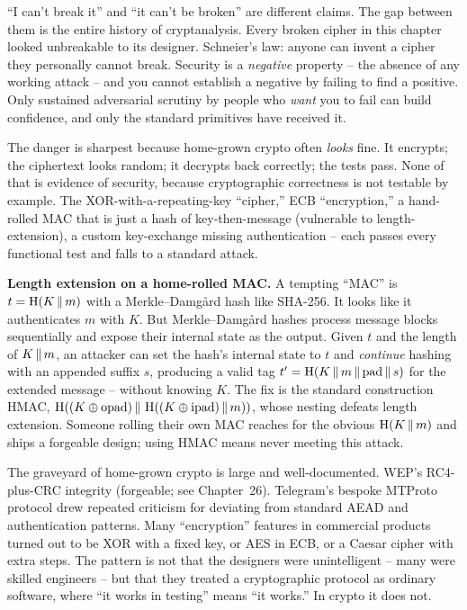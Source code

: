 \begin{intuitionbox}
``I can't break it'' and ``it can't be broken'' are different claims. The gap between them is the entire history of cryptanalysis. Every broken cipher in this chapter looked unbreakable to its designer. Schneier's law: anyone can invent a cipher they personally cannot break. Security is a \emph{negative} property -- the absence of any working attack -- and you cannot establish a negative by failing to find a positive. Only sustained adversarial scrutiny by people who \emph{want} you to fail can build confidence, and only the standard primitives have received it.
\end{intuitionbox}

The danger is sharpest because home-grown crypto often \emph{looks} fine. It encrypts; the ciphertext looks random; it decrypts back correctly; the tests pass. None of that is evidence of security, because cryptographic correctness is not testable by example. The XOR-with-a-repeating-key ``cipher,'' ECB ``encryption,'' a hand-rolled MAC that is just a hash of key-then-message (vulnerable to length-extension), a custom key-exchange missing authentication -- each passes every functional test and falls to a standard attack.

\begin{attackbox}
\textbf{Length extension on a home-rolled MAC.} A tempting ``MAC'' is $t = \operatorname{H}(K \,\|\, m)$ with a Merkle--Damg{\aa}rd hash like SHA-256. It looks like it authenticates $m$ with $K$. But Merkle--Damg{\aa}rd hashes process message blocks sequentially and expose their internal state as the output. Given $t$ and the length of $K \,\|\, m$, an attacker can set the hash's internal state to $t$ and \emph{continue} hashing with an appended suffix $s$, producing a valid tag $t' = \operatorname{H}(K \,\|\, m \,\|\, \text{pad} \,\|\, s)$ for the extended message -- without knowing $K$. The fix is the standard construction HMAC, $\operatorname{H}((K \oplus \text{opad}) \,\|\, \operatorname{H}((K \oplus \text{ipad}) \,\|\, m))$, whose nesting defeats length extension. Someone rolling their own MAC reaches for the obvious $\operatorname{H}(K\,\|\, m)$ and ships a forgeable design; using HMAC means never meeting this attack.
\end{attackbox}

\begin{applicationbox}
The graveyard of home-grown crypto is large and well-documented. WEP's RC4-plus-CRC integrity (forgeable; see Chapter~26). Telegram's bespoke MTProto protocol drew repeated criticism for deviating from standard AEAD and authentication patterns. Many ``encryption'' features in commercial products turned out to be XOR with a fixed key, or AES in ECB, or a Caesar cipher with extra steps. The pattern is not that the designers were unintelligent -- many were skilled engineers -- but that they treated a cryptographic protocol as ordinary software, where ``it works in testing'' means ``it works.'' In crypto it does not.
\end{applicationbox}

